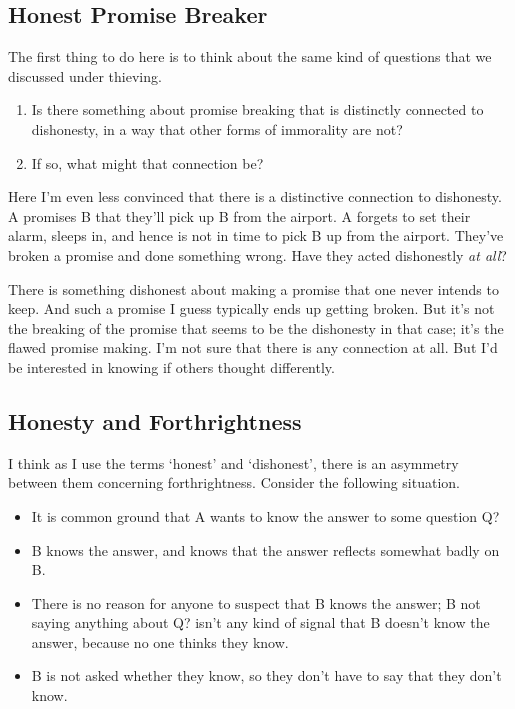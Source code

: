 \documentclass[
]{article}
\providecommand{\tightlist}{%
  \setlength{\itemsep}{0pt}\setlength{\parskip}{0pt}}
\begin{document}
\hypertarget{honest-promise-breaker}{%
\subsection{Honest Promise Breaker}\label{honest-promise-breaker}}

The first thing to do here is to think about the same kind of questions
that we discussed under thieving.

\begin{enumerate}
\def\labelenumi{\arabic{enumi}.}
\tightlist
\item
  Is there something about promise breaking that is distinctly connected
  to dishonesty, in a way that other forms of immorality are not?
\item
  If so, what might that connection be?
\end{enumerate}

Here I'm even less convinced that there is a distinctive connection to
dishonesty. A promises B that they'll pick up B from the airport. A
forgets to set their alarm, sleeps in, and hence is not in time to pick
B up from the airport. They've broken a promise and done something
wrong. Have they acted dishonestly \emph{at all}?

There is something dishonest about making a promise that one never
intends to keep. And such a promise I guess typically ends up getting
broken. But it's not the breaking of the promise that seems to be the
dishonesty in that case; it's the flawed promise making. I'm not sure
that there is any connection at all. But I'd be interested in knowing if
others thought differently.

\hypertarget{honesty-and-forthrightness}{%
\subsection{Honesty and
Forthrightness}\label{honesty-and-forthrightness}}

I think as I use the terms `honest' and `dishonest', there is an
asymmetry between them concerning forthrightness. Consider the following
situation.

\begin{itemize}
\tightlist
\item
  It is common ground that A wants to know the answer to some question
  Q?
\item
  B knows the answer, and knows that the answer reflects somewhat badly
  on B.
\item
  There is no reason for anyone to suspect that B knows the answer; B
  not saying anything about Q? isn't any kind of signal that B doesn't
  know the answer, because no one thinks they know.
\item
  B is not asked whether they know, so they don't have to say that they
  don't know.
\end{itemize}
\end{document}
